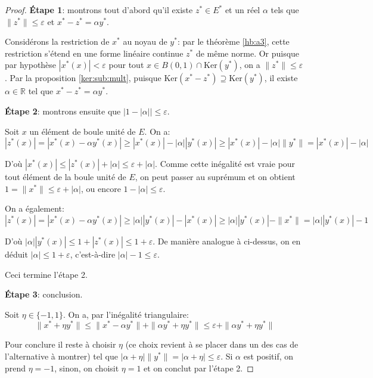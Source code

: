 \begin{proof}
  \textbf{\'{E}tape 1}:
  montrons tout d'abord qu'il existe $z^*\in E^*$ et un réel $\alpha$ tels
  que $\|z^*\|\leq \varepsilon$ et $x^* - z^* = \alpha y^*$.

  Considérons la restriction de $x^*$ au noyau de $y^*$: par le
  théorème \ref{hb:a3}, cette restriction s'étend en une forme linéaire
  continue $z^*$ de même norme.
  Or puisque par hypothèse $|x^*(x)| < \varepsilon$ pour tout $x\in B(0, 1)
  \cap \mathrm{Ker}(y^*)$, on a $\|z^*\|\leq \varepsilon$. Par la proposition
  \ref{ker:sub:mult}, puisque $\mathrm{Ker}(x^* - z^*) \supseteq
  \mathrm{Ker}(y^*)$, il existe $\alpha \in\mathbb{R}$ tel que $x^*-z^* =
  \alpha y^*$.

  \textbf{\'{E}tape 2}: montrons ensuite que $|1- |\alpha||\leq \varepsilon$.


  Soit $x$ un élément de boule unité de $E$. On a:
  $$|z^*(x)| = |x^*(x)-\alpha y^*(x)| \geq |x^*(x)| - |\alpha||y^*(x)|
  \geq |x^*(x)| - |\alpha| \|y^*\| = |x^*(x)| - |\alpha|$$

  D'où $|x^*(x)| \leq |z^*(x)| + |\alpha|\leq \varepsilon + |\alpha|$.
  Comme cette inégalité est vraie pour tout élément de la boule unité de $E$,
  on peut passer au suprémum et on obtient $1 = \|x^*\|\leq \varepsilon
  + |\alpha|$, ou encore $ 1 - |\alpha| \leq \varepsilon$.

  On a également:
   $$|z^*(x)| = |x^*(x)-\alpha y^*(x)| \geq |\alpha||y^*(x)| -|x^*(x)|
   \geq |\alpha| |y^*(x)| - \|x^*\| = |\alpha||y^*(x)| - 1$$

   D'où $|\alpha| |y^*(x)| \leq 1 + |z^*(x)|\leq 1 + \varepsilon$. De manière
   analogue à ci-dessus, on en déduit $|\alpha| \leq 1 + \varepsilon$,
   c'est-à-dire $|\alpha| - 1\leq \varepsilon$.

   Ceci termine l'étape 2.

   \textbf{\'{E}tape 3}: conclusion.

   Soit $\eta \in\{-1, 1\}$. On a, par l'inégalité triangulaire:
   $$\|x^*+ \eta y^*\| \leq \|x^* - \alpha y^*\| + \|\alpha y^* + \eta y^*\|
   \leq \varepsilon + \|\alpha y^* + \eta y^*\|$$

   Pour conclure il reste à choisir $\eta$ (ce choix revient à se
   placer dans un des cas de l'alternative à montrer) tel que
   $|\alpha + \eta| \|y^*\|= |\alpha + \eta| \leq \varepsilon$.
   Si $\alpha$ est positif, on prend  $\eta = -1$, sinon, on choisit
   $\eta = 1$ et on conclut par l'étape 2.
\end{proof}

